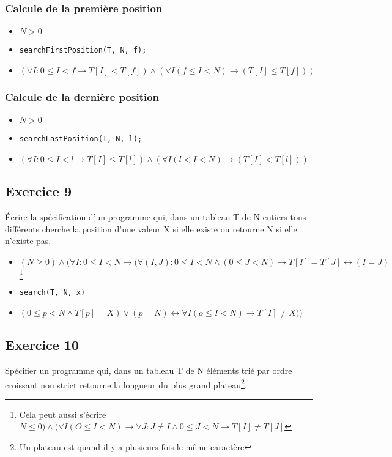 	\subsubsection{Calcule de la première position}
	\begin{itemize}
		\item $N > 0$ 
		\item \texttt{searchFirstPosition(T, N, f);} 
		\item $(\forall I :0 \leq I < f \rightarrow T[I] < T[f]) \wedge (\forall I (f \leq I < N) \rightarrow (T[I] \leq T[f]))$ 
	\end{itemize}
	\subsubsection{Calcule de la dernière position}
	\begin{itemize}
		\item $N > 0$ 
		\item \texttt{searchLastPosition(T, N, l);} 
		\item $(\forall I :0 \leq I < l \rightarrow T[I] \leq T[l]) \wedge 
			(\forall I (l < I < N) \rightarrow (T[I] < T[l]))$ 
	\end{itemize}

\subsection{Exercice 9}
	\'Ecrire la spécification d'un programme qui, dans un tableau T de N entiers tous différents cherche la position d'une valeur X si elle existe ou retourne N si elle n'existe pas.

	\begin{itemize}
		\item $(N\geq0) \wedge (\forall I : 0 \leq I < N \rightarrow (\forall (I, J) : 0 \leq I < N \wedge (0 \leq J < N) \rightarrow T[I] = T[J] \leftrightarrow (I = J)$\footnote{Cela peut aussi s'écrire $N\leq 0) \wedge (\forall I (O \leq I < N) \rightarrow \forall J : J \neq I \wedge 0 \leq J < N \rightarrow T[I] \neq T[J]$}
		\item \texttt{search(T, N, x)}
		\item $(0 \leq p < N \wedge T[p] = X) \vee (p=N) \leftrightarrow \forall I (o\leq I < N) \rightarrow T[I] \neq X))$ 
	\end{itemize}

	\subsection{Exercice 10}
	Spécifier un programme qui, dans un tableau T de N éléments trié par ordre croissant non strict retourne la longueur du plus grand plateau\footnote{Un plateau est quand il y a plusieurs fois le même caractère}.

